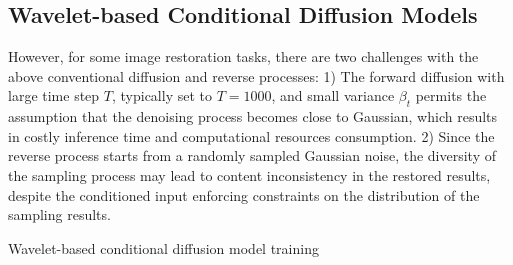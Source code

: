 \subsection{Wavelet-based Conditional Diffusion Models}\label{subsec:Wavelet-based Conditional Diffusion Models}
However, for some image restoration tasks, there are two challenges with the above conventional diffusion and reverse processes: 1) The forward diffusion with large time step $T$, typically set to $T=1000$, and small variance $\beta_t$ permits the assumption that the denoising process becomes close to Gaussian, which results in costly inference time and computational resources consumption. 2) Since the reverse process starts from a randomly sampled Gaussian noise, the diversity of the sampling process may lead to content inconsistency in the restored results, despite the conditioned input enforcing constraints on the distribution of the sampling results.
\begin{algorithm}[!t]
	\caption{Wavelet-based conditional diffusion model training}
	\label{algo:1} 
	  
	
	
	
\end{algorithm}
